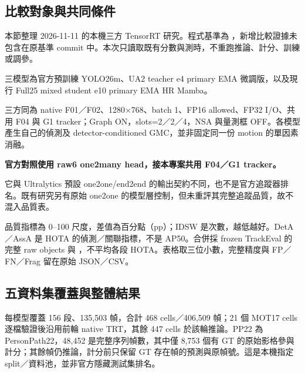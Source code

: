 \subsection{比較對象與共同條件}
本節整理 2026-11-11 的本機三方 TensorRT 研究。程式基準為 ，新增比較證據未包含在原基準 commit 中。本次只讀取既有分數與測時，不重跑推論、計分、訓練或調參。

三模型為官方預訓練 YOLO26m、UA2 teacher e4 primary EMA 微調版，以及現行 Full25 mixed student e10 primary EMA HR Mamba。

三方同為 native F01／F02、1280×768、batch 1、FP16 allowed、FP32 I/O、共用 F04 與 G1 tracker；Graph ON，slots=2／2／4，NSA 與量測框 OFF。各模型產生自己的偵測及 detector-conditioned GMC，並非固定同一份 motion 的單因素消融。

\begin{finding}
\textbf{官方對照使用 raw6 one2many head，接本專案共用 F04／G1 tracker。}\par
它與 Ultralytics 預設 one2one/end2end 的輸出契約不同，也不是官方追蹤器排名。既有研究另有原始 one2one 的模型層控制，但未重評其完整追蹤品質，故不混入品質表。
\end{finding}

品質指標為 0–100 尺度，差值為百分點（pp）；IDSW 是次數，越低越好。DetA／AssA 是 HOTA 的偵測／關聯指標，不是 AP50。合併採 frozen TrackEval 的完整 raw objects 與 ，不平均各段 HOTA。表格取三位小數，完整精度與 FP／FN／Frag 留在原始 JSON／CSV。\cite{primary156,trtcompare}

\subsection{五資料集覆蓋與整體結果}
每模型覆蓋 156 段、135,503 幀，合計 468 cells／406,509 幀；21 個 MOT17 cells 逐檔驗證後沿用前輪 native TRT，其餘 447 cells 於該輪推論。PP22 為 PersonPath22，48,452 是完整序列幀數，其中僅 8,753 個有 GT 的原始影格參與計分；其餘幀仍推論，計分前只保留 GT 存在幀的預測與原幀號。這是本機指定 split／資料池，並非官方隱藏測試集排名。

